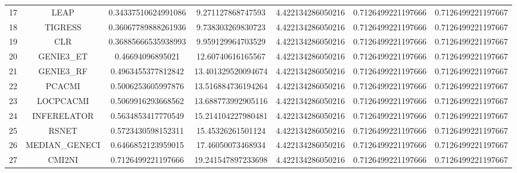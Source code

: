 \documentclass[a4paper,10pt]{article}
\begin{document}
\begin{landscape}
\begin{table}[!htp]
\begin{tabular}{ccccccc}
17&LEAP&0.34337510624991086&9.271127868747593&4.422134286050216&0.7126499221197666&0.7126499221197667\\
18&TIGRESS&0.36067789888261936&9.738303269830723&4.422134286050216&0.7126499221197666&0.7126499221197667\\
19&CLR&0.36885666535938993&9.959129964703529&4.422134286050216&0.7126499221197666&0.7126499221197667\\
20&GENIE3_ET&0.46694096895021&12.60740616165567&4.422134286050216&0.7126499221197666&0.7126499221197667\\
21&GENIE3_RF&0.4963455377812842&13.401329520094674&4.422134286050216&0.7126499221197666&0.7126499221197667\\
22&PCACMI&0.5006253605997876&13.516884736194264&4.422134286050216&0.7126499221197666&0.7126499221197667\\
23&LOCPCACMI&0.5069916293668562&13.688773992905116&4.422134286050216&0.7126499221197666&0.7126499221197667\\
24&INFERELATOR&0.5634853417770549&15.214104227980481&4.422134286050216&0.7126499221197666&0.7126499221197667\\
25&RSNET&0.5723430598152311&15.45326261501124&4.422134286050216&0.7126499221197666&0.7126499221197667\\
26&MEDIAN_GENECI&0.6466852123959015&17.46050073468934&4.422134286050216&0.7126499221197666&0.7126499221197667\\
27&CMI2NI&0.7126499221197666&19.241547897233698&4.422134286050216&0.7126499221197666&0.7126499221197667\\
\hline
\end{tabular}
\end{table}


\end{landscape}
\end{document}

